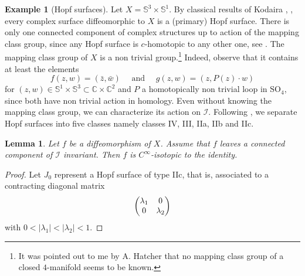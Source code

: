 \documentclass[JEP,XML,SOM,Unicode]{cedram}
\let\mathcal\mathscr
\theoremstyle{plain}
\newtheorem{lemma}[theorem]{Lemma}
\theoremstyle{definition}
\newtheorem{example}[theorem]{Example}
\theoremstyle{remark}
\numberwithin{equation}{section}
\newcommand{\CC}{{\mathbb{C}}}
\newcommand{\cI}{\mathcal{I}}
\begin{document}
\begin{example}[Hopf surfaces]
\label{Hopf}
Let $X=\mathbb S^3\times\mathbb S^1$. By classical results of Kodaira \cite{Ko}, \cite{BHPV}, every complex surface diffeomorphic to $X$ is a (primary) Hopf surface. There is only one connected component of complex structures up to action of the mapping class group, since any Hopf surface is $c$-homotopic to any other one, see \cite{We}. The mapping class group of $X$ is a non trivial group.\footnote{\label{Hatcher} It was pointed out to me by A. Hatcher that no mapping class group of a closed $4$-manifold seems to be known.} Indeed, observe that it contains at least the elements
\[
f(z,w)=(\bar z, \bar w)\quad\text{ and }\quad g(z,w)=(z, P(z)\cdot w)
\]
for $(z,w)\in\mathbb S^1\times\mathbb S^3\subset \CC\times\CC^2$ and $P$ a homotopically non trivial loop in $\text{SO}_4$, since both have non trivial action in homology. Even without knowing the mapping class group, we can characterize its action on $\cI$.
Following \cite[p.\,24]{We}, we separate Hopf surfaces into five classes namely classes IV, III, IIa, IIb and IIc.
\begin{lemma}
\label{Hopfcc}
Let $f$ be a diffeomorphism of $X$. Assume that $f$ leaves a connected component of $\cI$ invariant. Then $f$ is $C^\infty$-isotopic to the identity.
\end{lemma}

\begin{proof}
Let $J_0$ represent a Hopf surface of type IIc, that is, associated to a contracting diagonal matrix
\begin{equation}
\label{matrice}
\begin{pmatrix}
\lambda_1 &0\cr
0& \lambda_2
\end{pmatrix}
\end{equation}
with $0<\vert\lambda_1\vert<\vert\lambda_2\vert<1$.


\end{proof}
\end{example}
\end{document}
